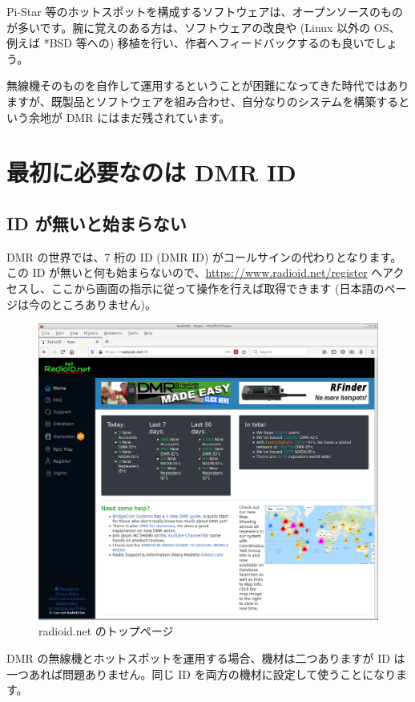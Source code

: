 \documentclass[a4j,oneside]{ujbook}
\begin{document}
Pi-Star 等のホットスポットを構成するソフトウェアは、オープンソースのものが多いです。腕に覚えのある方は、ソフトウェアの改良や (Linux 以外の OS、例えば *BSD 等への) 移植を行い、作者へフィードバックするのも良いでしょう。

無線機そのものを自作して運用するということが困難になってきた時代ではありますが、既製品とソフトウェアを組み合わせ、自分なりのシステムを構築するという余地が DMR にはまだ残されています。

\chapter{最初に必要なのは DMR ID}

\section{ID が無いと始まらない}

DMR の世界では、7 桁の ID (DMR ID) がコールサインの代わりとなります。この ID が無いと何も始まらないので、\url{https://www.radioid.net/register} へアクセスし、ここから画面の指示に従って操作を行えば取得できます (日本語のページは今のところありません)。
\begin{figure}[H]
 \centering
 \includegraphics[width=15cm]{img/radioid_net2.png}
 \caption{radioid.net のトップページ}
\end{figure}
DMR の無線機とホットスポットを運用する場合、機材は二つありますが ID は一つあれば問題ありません。同じ ID を両方の機材に設定して使うことになります。
\end{document}
